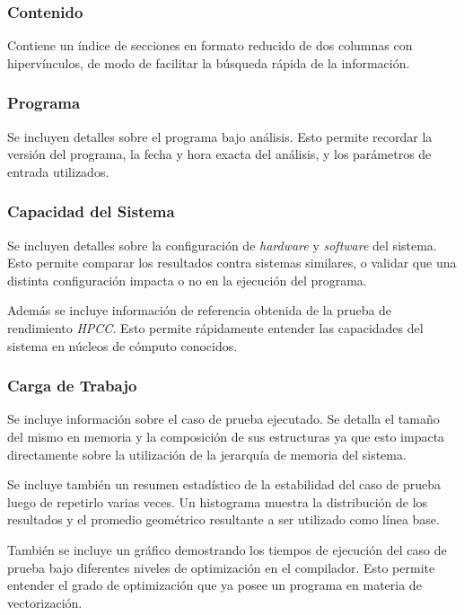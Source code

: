 \documentclass[a4paper]{report}
\begin{document}
\subsubsection{Contenido}

Contiene un índice de secciones en formato reducido de dos columnas con hipervínculos, de modo de facilitar la búsqueda rápida de la información.

\subsubsection{Programa}

Se incluyen detalles sobre el programa bajo análisis. Esto permite recordar la versión del programa, la fecha y hora exacta del análisis, y los parámetros de entrada utilizados.

\subsubsection{Capacidad del Sistema}

Se incluyen detalles sobre la configuración de {\it hardware} y {\it software} del sistema.
Esto permite comparar los resultados contra sistemas similares, o validar que una distinta configuración impacta o no en la ejecución del programa.

\bigskip

Además se incluye información de referencia obtenida de la prueba de rendimiento {\it HPCC}. Esto permite rápidamente entender las capacidades del sistema en núcleos de cómputo conocidos.

\subsubsection{Carga de Trabajo}

Se incluye información sobre el caso de prueba ejecutado. Se detalla el tamaño del mismo en memoria y la composición de sus estructuras ya que esto impacta directamente sobre la utilización de la jerarquía de memoria del sistema.

\bigskip

Se incluye también un resumen estadístico de la estabilidad del caso de prueba luego de repetirlo varias veces.
Un histograma muestra la distribución de los resultados y el promedio geométrico resultante a ser utilizado como línea base.

\bigskip

También se incluye un gráfico demostrando los tiempos de ejecución del caso de prueba bajo diferentes niveles de optimización en el compilador.
Esto permite entender el grado de optimización que ya posee un programa en materia de vectorización.
\end{document}

